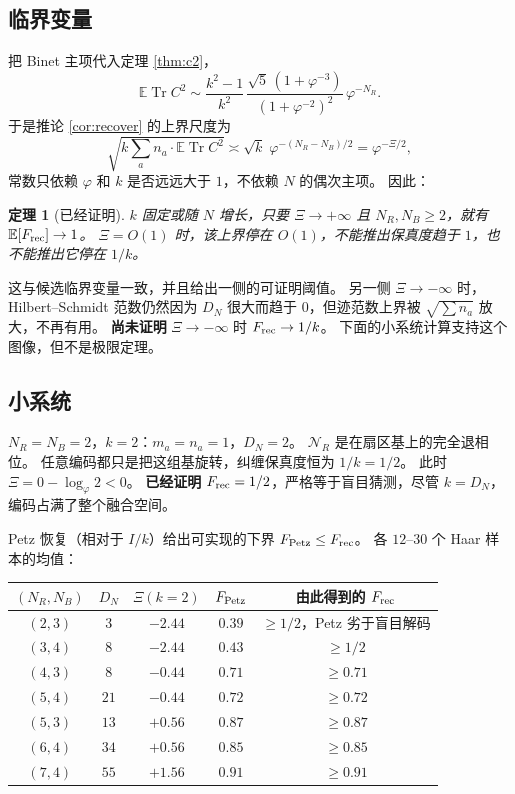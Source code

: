 \documentclass[11pt]{ctexart}
\newtheorem{theorem}{定理}
\theoremstyle{definition}
\theoremstyle{remark}
\newcommand{\E}{\mathbb E}
\newcommand{\Tr}{\operatorname{Tr}}
\newcommand{\ph}{\varphi}
\begin{document}
\subsection{临界变量}
把 Binet 主项代入定理 \ref{thm:c2}，
\[
\E\Tr C^2
\sim\frac{k^2-1}{k^2}\,
\frac{\sqrt5\,(1+\ph^{-3})}{(1+\ph^{-2})^2}\,\ph^{-N_R}.
\]
于是推论 \ref{cor:recover} 的上界尺度为
\[
\sqrt{k\sum_a n_a\cdot\E\Tr C^2}
\asymp \sqrt k\;\ph^{-(N_R-N_B)/2}
=\ph^{-\Xi/2},
\]
常数只依赖 $\ph$ 和 $k$ 是否远远大于 $1$，不依赖 $N$ 的偶次主项。
因此：

\begin{theorem}[已经证明]
\label{thm:xi}
$k$ 固定或随 $N$ 增长，只要 $\Xi\to+\infty$ 且 $N_R,N_B\ge 2$，就有 $\E[F_{\rm rec}]\to 1$。
$\Xi=O(1)$ 时，该上界停在 $O(1)$，不能推出保真度趋于 $1$，也不能推出它停在 $1/k$。
\end{theorem}

这与候选临界变量一致，并且给出一侧的可证明阈值。
另一侧 $\Xi\to-\infty$ 时，Hilbert--Schmidt 范数仍然因为 $D_N$ 很大而趋于 $0$，但迹范数上界被 $\sqrt{\sum n_a}$ 放大，不再有用。
\textbf{尚未证明} $\Xi\to-\infty$ 时 $F_{\rm rec}\to 1/k$。
下面的小系统计算支持这个图像，但不是极限定理。

\subsection{小系统}
$N_R=N_B=2$，$k=2$：$m_a=n_a=1$，$D_N=2$。
$\mathcal N_R$ 是在扇区基上的完全退相位。
任意编码都只是把这组基旋转，纠缠保真度恒为 $1/k=1/2$。
此时 $\Xi=0-\log_{\ph}2<0$。
\textbf{已经证明} $F_{\rm rec}=1/2$，严格等于盲目猜测，尽管 $k=D_N$，编码占满了整个融合空间。

Petz 恢复（相对于 $I/k$）给出可实现的下界 $F_{\rm Petz}\le F_{\rm rec}$。
各 $12$--$30$ 个 Haar 样本的均值：

\begin{center}
\begin{tabular}{ccccc}
\toprule
$(N_R,N_B)$ & $D_N$ & $\Xi(k=2)$ & $F_{\rm Petz}$ & 由此得到的 $F_{\rm rec}$ \\
\midrule
$(2,3)$ & $3$ & $-2.44$ & $0.39$ & $\ge 1/2$，Petz 劣于盲目解码 \\
$(3,4)$ & $8$ & $-2.44$ & $0.43$ & $\ge 1/2$ \\
$(4,3)$ & $8$ & $-0.44$ & $0.71$ & $\ge 0.71$ \\
$(5,4)$ & $21$ & $-0.44$ & $0.72$ & $\ge 0.72$ \\
$(5,3)$ & $13$ & $+0.56$ & $0.87$ & $\ge 0.87$ \\
$(6,4)$ & $34$ & $+0.56$ & $0.85$ & $\ge 0.85$ \\
$(7,4)$ & $55$ & $+1.56$ & $0.91$ & $\ge 0.91$ \\
\bottomrule
\end{tabular}
\end{center}
\end{document}
